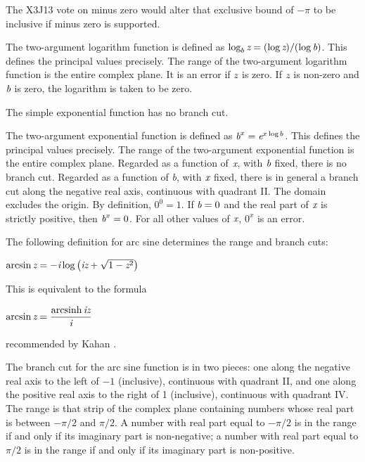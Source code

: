 \begin{flushdesc}
\begin{new}
The X3J13 vote on minus zero
would alter that exclusive bound of $-\pi$  to be inclusive if minus zero is supported.
\end{new}

The two-argument logarithm function is defined as $ \log_{b} \emph{z}=(\log \emph{z})/(\log \emph{b}) $.
This defines the principal values precisely.  The range of the two-argument
logarithm function is the entire complex plane.
It is an error if $\emph{z}$ is zero.  If $\emph{z}$ is non-zero and $\emph{b}$ is zero,
the logarithm is taken to be zero.

\item[\cdf{exp}]
The simple exponential function has no branch cut.

\item[\cdf{expt}]
The two-argument exponential function is defined
as $ \emph{b}^{x}=\emph{e}^{x \log b } $.
This defines the principal values precisely.  The range of the
two-argument exponential function is the entire complex plane.  Regarded
as a function of $\emph{x}$, with $\emph{b}$ fixed, there is no branch cut.
Regarded as a function of \emph{b}, with $\emph{x}$ fixed, there is in general
a branch cut along the negative real axis, continuous with quadrant II.
The domain excludes the origin.
By definition, $0^0=1$.  If $\emph{b}=0$ and the real part of $\emph{x}$ is strictly
positive, then $\emph{b}^{x}=0$.
For all other values of $\emph{x}$, $0^{x}$
is an error.

\item[\cdf{asin}]
The following definition for arc sine determines the range and
branch cuts:
\begin{tabbing}
$ \arcsin \emph{z}=-\emph{i} \log \left(\emph{i}\emph{z}+\sqrt{1-\emph{z}^2}\right) $
\end{tabbing}

\begin{newer}\noindent
This is equivalent to the formula
\begin{tabbing}
$ \displaystyle \arcsin \emph{z} = { \mathop\textrm{arcsinh}\nolimits \emph{i}\emph{z} \over \emph{i} }$
\end{tabbing}
recommended by Kahan \cite{KAHAN-COMPLEX-FNS}.
\end{newer}

The branch cut for the arc sine function is in two pieces:
one along the negative real axis to the left of $-1$
(inclusive), continuous with quadrant II, and one along the positive real
axis to the right of 1 (inclusive), continuous with quadrant IV.  The
range is that strip of the complex plane containing numbers whose real
part is between $-\pi/2$ and $\pi/2$.  A number with real
part equal to $-\pi/2$ is in the range if and only if its imaginary
part is non-negative; a number with real part equal to $\pi/2$ is in
the range if and only if its imaginary part is non-positive.


\end{flushdesc}
